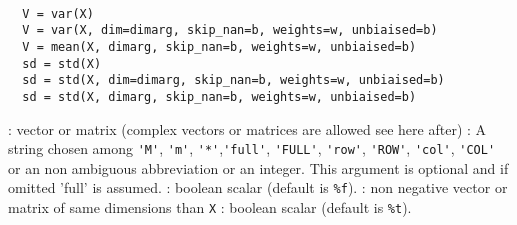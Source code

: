 
\begin{mandesc}
   \\
\end{mandesc}

\begin{calling_sequence}
\begin{verbatim}
  V = var(X)
  V = var(X, dim=dimarg, skip_nan=b, weights=w, unbiaised=b)  
  V = mean(X, dimarg, skip_nan=b, weights=w, unbiaised=b)  
  sd = std(X)
  sd = std(X, dim=dimarg, skip_nan=b, weights=w, unbiaised=b)  
  sd = std(X, dimarg, skip_nan=b, weights=w, unbiaised=b)  
\end{verbatim}
\end{calling_sequence}
\begin{parameters}
  \begin{varlist}
    : vector or matrix (complex vectors or matrices are allowed see here after)
    : A string chosen among \verb+'M'+, \verb+'m'+, \verb+'*'+,\verb+'full'+, \verb+'FULL'+, \verb+'row'+,
    \verb+'ROW'+, \verb+'col'+, \verb+'COL'+ or an non ambiguous abbreviation or an integer. 
    This argument is optional and if omitted 'full' is assumed.
    : boolean scalar (default is \verb+%f+).
    : non negative vector or matrix of same dimensions than \verb+X+ 
    :  boolean scalar (default is \verb+%t+).
  \end{varlist}
\end{parameters}

